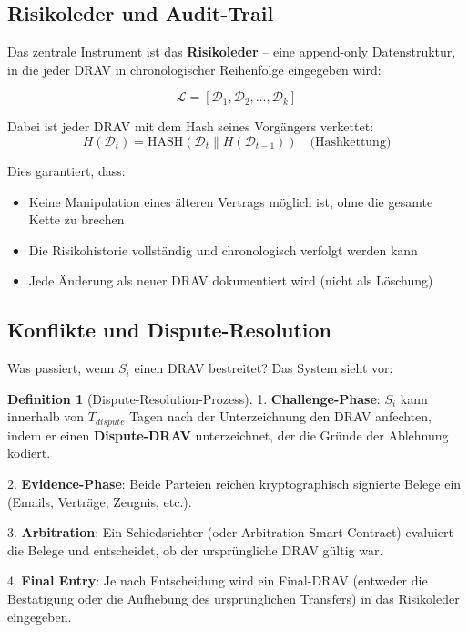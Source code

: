 \documentclass[a4paper, 12pt, twoside, openright]{report}
\theoremstyle{definition}
\newtheorem{definition}[theorem]{Definition}
\theoremstyle{definition}
\begin{document}
\subsection{Risikoleder und Audit-Trail}

Das zentrale Instrument ist das \textbf{Risikoleder} -- eine append-only Datenstruktur, in die jeder DRAV in chronologischer Reihenfolge eingegeben wird:

\begin{equation}
\mathcal{L} = [\mathcal{D}_1, \mathcal{D}_2, \ldots, \mathcal{D}_k]
\end{equation}

Dabei ist jeder DRAV mit dem Hash seines Vorgängers verkettet:
\begin{equation}
H(\mathcal{D}_t) = \text{HASH}(\mathcal{D}_t \| H(\mathcal{D}_{t-1})) \quad \text{(Hashkettung)}
\end{equation}

Dies garantiert, dass:
\begin{itemize}
    \item Keine Manipulation eines älteren Vertrags möglich ist, ohne die gesamte Kette zu brechen
    \item Die Risikohistorie vollständig und chronologisch verfolgt werden kann
    \item Jede Änderung als neuer DRAV dokumentiert wird (nicht als Löschung)
\end{itemize}

\subsection{Konflikte und Dispute-Resolution}

Was passiert, wenn $S_i$ einen DRAV bestreitet? Das System sieht vor:

\begin{definition}[Dispute-Resolution-Prozess]
1. \textbf{Challenge-Phase}: $S_i$ kann innerhalb von $T_{dispute}$ Tagen nach der Unterzeichnung den DRAV anfechten, indem er einen \textbf{Dispute-DRAV} unterzeichnet, der die Gründe der Ablehnung kodiert.

2. \textbf{Evidence-Phase}: Beide Parteien reichen kryptographisch signierte Belege ein (Emails, Verträge, Zeugnis, etc.).

3. \textbf{Arbitration}: Ein Schiedsrichter (oder Arbitration-Smart-Contract) evaluiert die Belege und entscheidet, ob der ursprüngliche DRAV gültig war.

4. \textbf{Final Entry}: Je nach Entscheidung wird ein Final-DRAV (entweder die Bestätigung oder die Aufhebung des ursprünglichen Transfers) in das Risikoleder eingegeben.
\end{definition}
\end{document}
